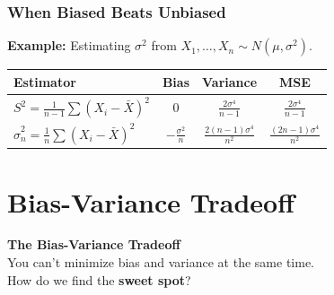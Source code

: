 \documentclass[aspectratio=169]{beamer}
\begin{document}
\begin{frame}
\frametitle{When Biased Beats Unbiased}

\textbf{Example:} Estimating $\sigma^2$ from $X_1,\ldots,X_n \sim N(\mu, \sigma^2)$.

\vspace{0.2cm}
\begin{center}
\renewcommand{\arraystretch}{1.6}
\begin{tabular}{lccc}
  \textbf{Estimator} & \textbf{Bias} & \textbf{Variance} & \textbf{MSE} \\
  \hline
  $S^2 = \frac{1}{n-1}\sum(X_i - \bar{X})^2$ & $0$ & $\frac{2\sigma^4}{n-1}$ & $\frac{2\sigma^4}{n-1}$ \\[6pt]
  $\hat\sigma^2_n = \frac{1}{n}\sum(X_i - \bar{X})^2$ & $-\frac{\sigma^2}{n}$ & $\frac{2(n-1)\sigma^4}{n^2}$ & $\frac{(2n-1)\sigma^4}{n^2}$ \\[6pt]
  \hline
\end{tabular}
\end{center}

\vspace{0.2cm}
\begin{center}
\end{center}
\end{frame}


\section{Bias-Variance Tradeoff}

\begin{frame}
\begin{center}
\vspace{1cm}
{\LARGE\bfseries\textcolor{popblue}{The Bias-Variance Tradeoff}}\\[15pt]
{\large You can't minimize bias and variance at the same time.}\\[8pt]
{\large How do we find the \textbf{sweet spot}?}
\end{center}
\end{frame}
\end{document}

